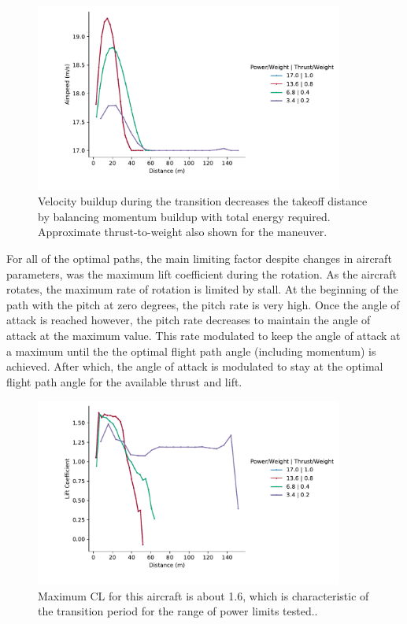 \documentclass[10pt,english]{article}
\begin{document}
\begin{figure}[H]
\centering
\includegraphics[trim={.0cm 0.5cm .0cm 0cm},clip,width=0.9\textwidth]{d_Va}
\vspace{-5pt}
\caption{Velocity buildup during the transition decreases the takeoff distance by balancing momentum buildup with total energy required. Approximate thrust-to-weight also shown for the maneuver.}
\label{f:d_Va}
\end{figure}

For all of the optimal paths, the main limiting factor despite changes in aircraft parameters, was the maximum lift coefficient during the rotation.  As the aircraft rotates, the maximum rate of rotation is limited by stall.  At the beginning of the path with the pitch at zero degrees, the pitch rate is very high.  Once the angle of attack is reached however, the pitch rate decreases to maintain the angle of attack at the maximum value.  This rate modulated to keep the angle of attack at a maximum until the the optimal flight path angle (including momentum) is achieved.  After which, the angle of attack is modulated to stay at the optimal flight path angle for the available thrust and lift.

\begin{figure}[H]
\centering
\includegraphics[trim={.0cm 0.5cm .0cm 0cm},clip,width=0.9\textwidth]{d_CL}
\vspace{-5pt}
\caption{Maximum CL for this aircraft is about 1.6, which is characteristic of the transition period for the range of power limits tested..}
\label{f:d_CL}
\end{figure}
\end{document}
